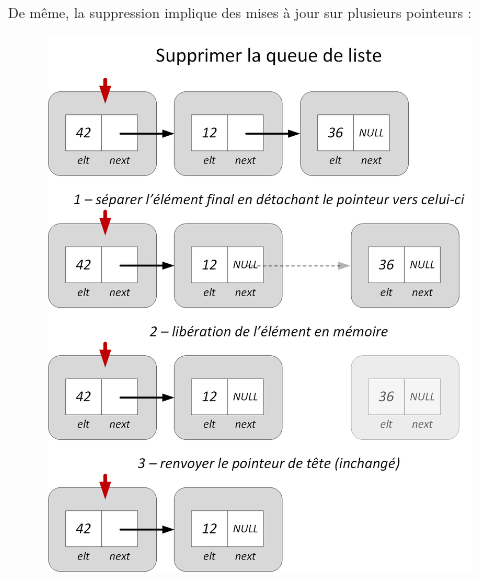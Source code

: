 \documentclass[11pt,a4paper]{article}
\begin{document}
\pagebreak

De même, la suppression implique des mises à jour sur plusieurs pointeurs :

\vfillFirst

\begin{figure}[ht!]
\centering
\centerline{   %
\includegraphics[scale=0.85]{img/listes/Listes_Pointeurs_4_1_suppression_queue.png}
}
\end{figure}

\vfillLast

\pagebreak

\vfillFirst
\end{document}

